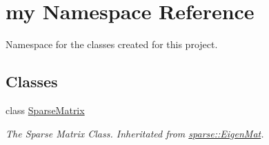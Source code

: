 \hypertarget{namespacemy}{\section{my Namespace Reference}
\label{namespacemy}
}


Namespace for the classes created for this project.  


\subsection*{Classes}
\begin{DoxyCompactItemize}
\item 
class \hyperlink{classmy_1_1SparseMatrix}{Sparse\+Matrix}
\begin{DoxyCompactList}\small\item\em The Sparse Matrix Class. Inheritated from \hyperlink{namespacesparse_af3fe1ceb08995f6d08e5f96fbbe021bf}{sparse\+::\+Eigen\+Mat}. \end{DoxyCompactList}\end{DoxyCompactItemize}
